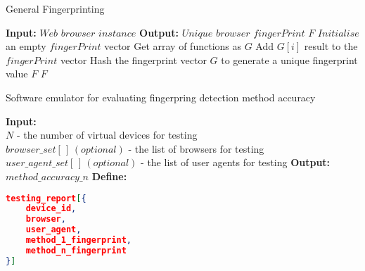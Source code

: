 \documentclass[]{article}
\begin{document}
  \begin{algorithm}
    \caption{General Fingerprinting}
    \label{algorithm}
    \begin{algorithmic}[1]
    \STATE \textbf{Input:} $Web$ $browser$ $instance$
    \STATE \textbf{Output:} $Unique$ $browser$ $fingerPrint$ $F$
      \STATE $Initialise$ an empty $fingerPrint$ vector
      \STATE Get array of functions as $G$		        
        \STATE Add $G[i]$ result to the $fingerPrint$ vector
      \ENDFOR
      \STATE Hash the fingerprint vector $G$ to generate a unique fingerprint value $F$
    \RETURN $F$
    \end{algorithmic}
  \end{algorithm}
  \begin{algorithm}
		\caption{Software emulator for evaluating fingerpring detection method accuracy}
		\label{alg:cap}
		\begin{algorithmic}[1]
        \medbreak
		\STATE \textbf{Input:} \\$N$ - the number of virtual devices for testing \\
        $browser\_set[\,]\, (optional)$ - the list of browsers for testing \\
        $user\_agent\_set[\,]\,(optional)$ - the list of user agents for testing
        \medbreak
		\STATE \textbf{Output:} $method\_accuracy\_n$
        \medbreak
        \STATE \textbf{Define:}\\
        \begin{lstlisting}[language=json,firstnumber=1] 
testing_report[{
    device_id,
    browser,
    user_agent,
    method_1_fingerprint,
    method_n_fingerprint
}]
        \end{lstlisting}


\end{algorithmic}
\end{algorithm}
\end{document}
